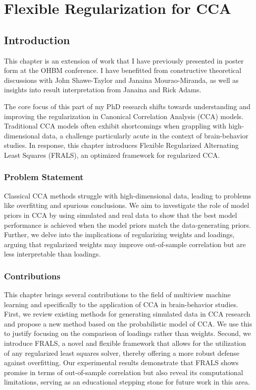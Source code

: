 \chapter{Flexible Regularization for CCA}
\label{chap:als}
\minitoc

\section{Introduction}\label{sec:introduction}

This chapter is an extension of work that I have previously presented in poster form at the OHBM conference.
I have benefitted from constructive theoretical discussions with John Shawe-Taylor and Janaina Mourao-Miranda, as well as insights into result interpretation from Janaina and Rick Adams.

The core focus of this part of my PhD research shifts towards understanding and improving the regularization in Canonical Correlation Analysis (CCA) models.
Traditional CCA models often exhibit shortcomings when grappling with high-dimensional data, a challenge particularly acute in the context of brain-behavior studies.
In response, this chapter introduces Flexible Regularized Alternating Least Squares (FRALS), an optimized framework for regularized CCA.

\subsection{Problem Statement}\label{subsec:problem-statement}

Classical CCA methods struggle with high-dimensional data, leading to problems like overfitting and spurious conclusions.
We aim to investigate the role of model priors in CCA by using simulated and real data to show that the best model performance is achieved when the model priors match the data-generating priors.
Further, we delve into the implications of regularizing weights and loadings, arguing that regularized weights may
improve out-of-sample correlation but are less interpretable than loadings.

\subsection{Contributions}\label{subsec:contributions}

This chapter brings several contributions to the field of multiview machine learning and specifically to the application of CCA in brain-behavior studies.
First, we review existing methods for generating simulated data in CCA research and propose a new method based on the probabilistic model of CCA. We use this to justify focusing on the comparison of loadings rather than weights.
Second, we introduce FRALS, a novel and flexible framework that allows for the utilization of any regularized least squares solver, thereby offering a more robust defense against overfitting.
Our experimental results demonstrate that FRALS shows promise in terms of out-of-sample correlation but also reveal its computational limitations, serving as an educational stepping stone for future work in this area.


